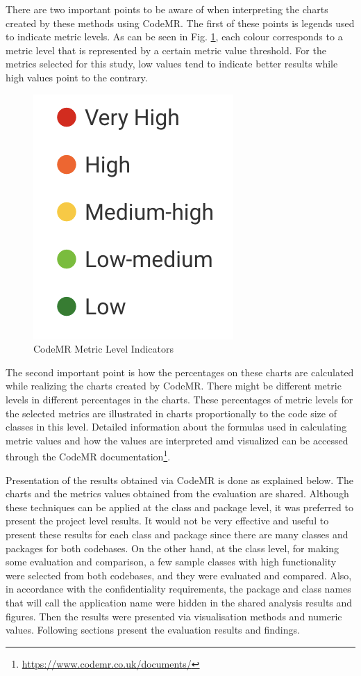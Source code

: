 There are two important points to be aware of when interpreting the charts created by these methods using CodeMR. The first of these points is legends used to indicate metric levels. As can be seen in Fig. \ref{fig:code-mr-legends}, each colour corresponds to a metric level that is represented by a certain metric value threshold. For the metrics selected for this study, low values tend to indicate better results while high values point to the contrary.
\begin{figure}[ht!]
    \centering
    \includegraphics[scale=0.7]{figures/code-mr-legends.png}
    \caption{CodeMR Metric Level Indicators}
    \label{fig:code-mr-legends}
\end{figure}
\FloatBarrier

The second important point is how the percentages on these charts are calculated while realizing the charts created by CodeMR. There might be different metric levels in different percentages in the charts. These percentages of metric levels for the selected metrics are illustrated in charts proportionally to the code size of classes in this level. Detailed information about the formulas used in calculating metric values and how the values are interpreted amd visualized can be accessed through the CodeMR documentation\footnote{\label{fn:codemr} \url{https://www.codemr.co.uk/documents/}}.

Presentation of the results obtained via CodeMR is done as explained below. The charts and the  metrics values obtained from the evaluation are shared. Although these techniques can be applied at the class and package level, it was preferred to present the project level results. It would not be very effective and useful to present these results for each class and package since there are many classes and packages for both codebases. On the other hand, at the class level, for making some evaluation and comparison, a few sample classes with high functionality were selected from both codebases, and they were evaluated and compared. Also, in accordance with the confidentiality requirements, the package and class names that will call the application name were hidden in the shared analysis results and figures. Then the results were presented via visualisation methods and numeric values. Following sections present the evaluation results and findings.


